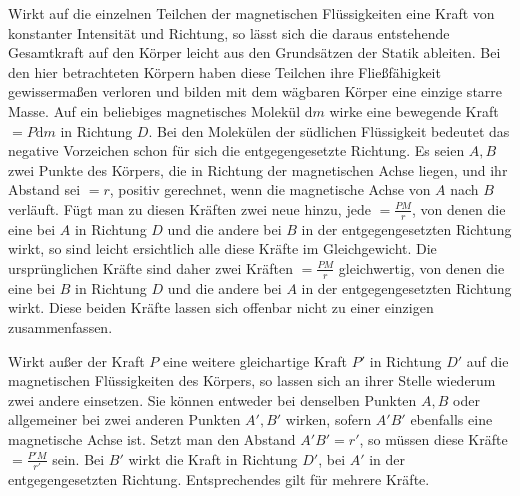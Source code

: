 Wirkt auf die einzelnen Teilchen der magnetischen Flüssigkeiten eine Kraft von konstanter Intensität und Richtung, so lässt sich die daraus entstehende Gesamtkraft auf den Körper leicht aus den Grundsätzen der Statik ableiten. Bei den hier betrachteten Körpern haben diese Teilchen ihre Fließfähigkeit gewissermaßen verloren und bilden mit dem wägbaren Körper eine einzige starre Masse. Auf ein beliebiges magnetisches Molekül $\mathrm{d}m$ wirke eine bewegende Kraft $=P\mathrm{d}m$ in Richtung $D$. Bei den Molekülen der südlichen Flüssigkeit bedeutet das negative Vorzeichen schon für sich die entgegengesetzte Richtung. Es seien $A,B$ zwei Punkte des Körpers, die in Richtung der magnetischen Achse liegen, und ihr Abstand sei $=r$, positiv gerechnet, wenn die magnetische Achse von $A$ nach $B$ verläuft. Fügt man zu diesen Kräften zwei neue hinzu, jede $=\frac{PM}{r}$, von denen die eine bei $A$ in Richtung $D$ und die andere bei $B$ in der entgegengesetzten Richtung wirkt, so sind leicht ersichtlich alle diese Kräfte im Gleichgewicht. Die ursprünglichen Kräfte sind daher zwei Kräften $=\frac{PM}{r}$ gleichwertig, von denen die eine bei $B$ in Richtung $D$ und die andere bei $A$ in der entgegengesetzten Richtung wirkt. Diese beiden Kräfte lassen sich offenbar nicht zu einer einzigen zusammenfassen.

Wirkt außer der Kraft $P$ eine weitere gleichartige Kraft $P'$ in Richtung $D'$ auf die magnetischen Flüssigkeiten des Körpers, so lassen sich an ihrer Stelle wiederum zwei andere einsetzen. Sie können entweder bei denselben Punkten $A,B$ oder allgemeiner bei zwei anderen Punkten $A',B'$ wirken, sofern $A'B'$ ebenfalls eine magnetische Achse ist. Setzt man den Abstand $A'B'=r'$, so müssen diese Kräfte $=\frac{P'M}{r'}$ sein. Bei $B'$ wirkt die Kraft in Richtung $D'$, bei $A'$ in der entgegengesetzten Richtung. Entsprechendes gilt für mehrere Kräfte.

